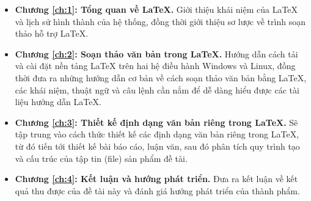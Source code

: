 \begin{itemize}
 \item \textbf{Chương \ref{ch:1}: Tổng quan về LaTeX.} Giới thiệu khái niệm của LaTeX và lịch sử hình thành của hệ thống, đồng thời giới
 thiệu sơ lược về trình soạn thảo hỗ trợ LaTeX.
 \item \textbf{Chương \ref{ch:2}: Soạn thảo văn bản trong LaTeX.} Hướng dẫn cách tải và cài đặt nền tảng LaTeX trên hai
 hệ điều hành Windows và Linux, đồng thời đưa ra những hướng dẫn cơ bản về cách soạn thảo văn bản bằng LaTeX, các khái niệm,
 thuật ngữ và câu lệnh cần nắm để dễ dàng hiểu được các tài liệu hướng dẫn LaTeX.
 \item \textbf{Chương \ref{ch:3}: Thiết kế định dạng văn bản riêng trong LaTeX.} Sẽ tập trung vào cách thức thiết kế các
 định dạng văn bản riêng trong LaTeX, từ đó tiến tới thiết kế bài báo cáo, luận văn, sau đó
 phân tích quy trình tạo và cấu trúc của tập tin (file) sản phẩm đề tài.
 \item \textbf{Chương \ref{ch:4}: Kết luận và hướng phát triển.} Đưa ra kết luận về kết quả thu được của đề tài này
 và đánh giá hướng phát triển của thành phẩm.
\end{itemize}
